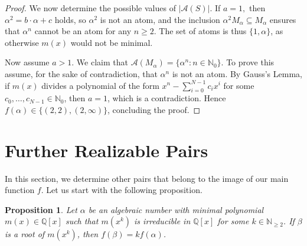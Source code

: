 \documentclass[11pt]{amsart}
\newtheorem{proposition}[theorem]{Proposition}
\theoremstyle{definition}
\theoremstyle{remark}
\numberwithin{equation}{section}
\newcommand{\nn}{\mathbb{N}}
\newcommand{\qq}{\mathbb{Q}}
\begin{document}
\begin{proof}
    We now determine the possible values of $|\mathcal{A}(S)|$.
    If $a=1,$ then $\alpha^2 = b\cdot \alpha + c$ holds, so $\alpha^2$ is not an atom, and the inclusion $\alpha^2 M_\alpha \subseteq M_\alpha$ ensures that $\alpha^n$ cannot be an atom for any $n \ge 2$. The set of atoms is thus $\{1,\alpha\}$, as otherwise $m(x)$ would not be minimal.
    
    Now assume $a>1$. We claim that $\mathcal{A}(M_\alpha) = \{\alpha^n : n \in \nn_0\}$. To prove this assume, for the sake of contradiction, that $\alpha^n$ is not an atom. By Gauss's Lemma, if $m(x)$ divides a polynomial of the form $x^n-\sum_{i=0}^{N-1} c_ix^i$ for some $c_0, \dots, c_{N-1} \in \mathbb{N}_0$, then $a=1$, which is a contradiction. Hence $f(\alpha) \in \{(2,2), (2,\infty) \}$, concluding the proof.
\end{proof}


\bigskip
\section{Further Realizable Pairs}
\label{sec:further realizable pairs}

In this section, we determine other pairs that belong to the image of our main function $f$. Let us start with the following proposition.

\begin{proposition} \label{prop:when $m(x^k)$ is irreducible}
    Let $\alpha$ be an algebraic number with minimal polynomial $m(x) \in \qq[x]$ such that $m(x^k)$ is irreducible in $\qq[x]$ for some $k \in \nn_{\ge 2}$. If $\beta$ is a root of $m(x^k)$, then $f(\beta) = kf(\alpha)$.
\end{proposition}
\end{document}

